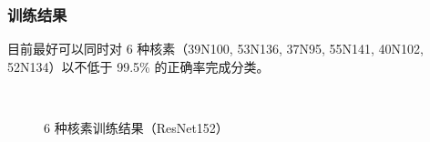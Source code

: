 \documentclass[AutoFakeBold]{LZUThesis}
\begin{document}
\subsubsection{训练结果}
目前最好可以同时对 6 种核素（39N100, 53N136, 37N95, 55N141, 40N102, 52N134）以不低于 99.5\% 的正确率完成分类。

\begin{figure}[H]
	\centering
	\\	
    \caption{6 种核素训练结果（ResNet152）}
    \label{fig_learn6_resnet152}
\end{figure}
\end{document}
